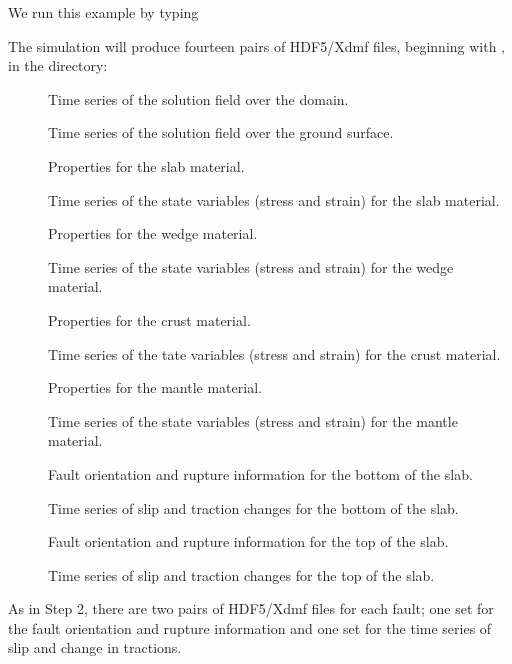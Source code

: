 We run this example by typing
The simulation will produce fourteen pairs of HDF5/Xdmf files,
beginning with , in the 
directory:
\begin{description}
\item[] Time series of the solution field over the domain.
\item[] Time series of the solution field over the ground surface.
\item[] Properties for
  the slab material.
\item[] Time series of the state variables (stress and strain) for the slab material.
\item[] Properties for
  the wedge material.
\item[] Time series of the state variables (stress and strain) for the wedge material.
\item[] Properties for
  the crust material.
\item[] Time series of the tate variables
  (stress and strain) for the crust material.
\item[] Properties for
  the mantle material.
\item[] Time series of the state variables
  (stress and strain) for the mantle material.
\item[] Fault orientation
  and rupture information for the bottom of the slab.
\item[] Time series of slip and
  traction changes for the bottom of the slab.
\item[] Fault orientation
  and rupture information for the top of the slab.
\item[] Time series of slip and
  traction changes for the top of the slab.
\end{description}
As in Step 2, there are two pairs of HDF5/Xdmf files for
each fault; one set for the fault orientation and rupture information
and one set for the time series of slip and change in tractions.

